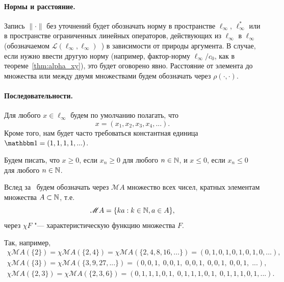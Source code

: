 \paragraph{Нормы и расстояние.}
Запись $\|\cdot\|$ без уточнений будет обозначать норму в пространстве $\ell_\infty$, $\ell_\infty^*$
или в пространстве ограниченных линейных операторов, действующих из $\ell_\infty$ в $\ell_\infty$ (обозначаемом $\mathcal L (\ell_\infty, \ell_\infty)$~)
в зависимости от природы аргумента.
В случае, если нужно ввести другую норму (например, фактор-норму $\ell_\infty / c_0$, как в теореме~\ref{thm:alpha_xy}),
это будет оговорено явно.
Расстояние от элемента до множества или между двумя множествами будем обозначать через $\rho(\cdot, \cdot)$.


\paragraph{Последовательности.}
Для любого $x\in\ell_\infty$ будем по умолчанию полагать, что
\begin{equation}
	x=(x_1, x_2, x_3, x_4, ...)
	.
\end{equation}
Кроме того, нам будет часто требоваться константная единица $\one = (1, 1, 1, 1, ...)$.

Будем писать, что $x\geq 0$, если $x_n \geq 0$ для любого $n\in \mathbb{N}$, и $x\leq 0$, если $x_n \leq 0$ для любого $n\in \mathbb{N}$.

Вслед за~\cite{hall1992behrend} будем обозначать через $\mathscr{M}A$ множество всех чисел,
кратных элементам множества $A\subset\mathbb{N}$, т.е.
\begin{equation}
	\mathscr{M}A = \{ka: k\in\mathbb{N}, a\in A\}
	,
\end{equation}
через $\chi F$ "--- характеристическую функцию множества $F$.

Так, например,
\begin{gather}
	\chi \mathscr{M}\!A(\{2\}) = \chi \mathscr{M}\!A(\{2, 4\}) = \chi \mathscr{M}\!A(\{2,4,8,16,...\})
	= (0,1,0,1,0,1,0,1,0,...),
\\
	\chi \mathscr{M}\!A(\{3\}) = \chi \mathscr{M}\!A(\{3,9,27,...\}) = (0,0,1,\;0,0,1,\;0,0,1,\;0,0,1,\;0,0,1,\;...),
\\
	\chi \mathscr{M}\!A(\{2,3\}) = \chi \mathscr{M}\!A(\{2,3,6\}) = (0,1,1,1,0,1,\;0,1,1,1,0,1,\;0,1,1,1,0,1,...).
\end{gather}


